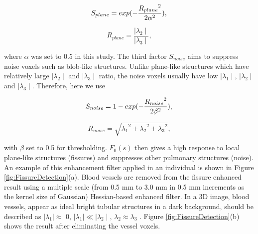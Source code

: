 \documentclass[]{spie}  %
\begin{document}
{\begin{equation}
\label{eq:FissureHessian3}
S_{plane} = exp(-\frac{{R_{plane}}^2}{2\alpha^2}), \\
\end{equation}

\begin{equation}
\label{eq:FissureHessian4}
R_{plane} = \frac{\mid\lambda_{2}\mid}{\mid\lambda_{3}\mid},
\end{equation}

\noindent where $\alpha$ was set to 0.5 in this study. The third factor $S_{noise}$ aims to suppress noise voxels such as blob-like structures. Unlike plane-like structures which have relatively large $\mid\lambda_{2}\mid$ and $\mid\lambda_{3}\mid$ ratio, the noise voxels usually have low $\mid\lambda_{1}\mid$, $\mid\lambda_{2}\mid$ and $\mid\lambda_{3}\mid$. Therefore, here we use

\begin{equation}
\label{eq:FissureHessian5}
S_{noise} = 1 - exp(-\frac{{R_{noise}}^2}{2\beta^2}), \\
\end{equation}

\begin{equation}
\label{eq:FissureHessian6}
R_{noise} = \sqrt{{\lambda_1}^2+{\lambda_2}^2+{\lambda_3}^2},
\end{equation}

\noindent with $\beta$ set to 0.5 for thresholding. $F_0(s)$ then gives a high response to local plane-like structures (fissures) and suppresses other pulmonary structures (noise). An example of this enhancement filter applied in an individual is shown in Figure \ref{fig:FissureDetection}(a). Blood vessels are removed from the fissure enhanced result using a multiple scale (from 0.5 mm to 3.0 mm in 0.5 mm increments as the kernel size of Gaussian) Hessian-based enhanced filter. In a 3D image, blood vessels, appear as ideal bright tubular structures in a dark background, should be described as $\mid\lambda_{1}\mid\approx$ 0, $\mid\lambda_{1}\mid\ll\mid\lambda_{2}\mid$,  $\lambda_{2}\approx\lambda_{3}$ \cite{frangi1998multiscale}. Figure \ref{fig:FissureDetection}(b) shows the result after eliminating the vessel voxels.

}
\end{document}
